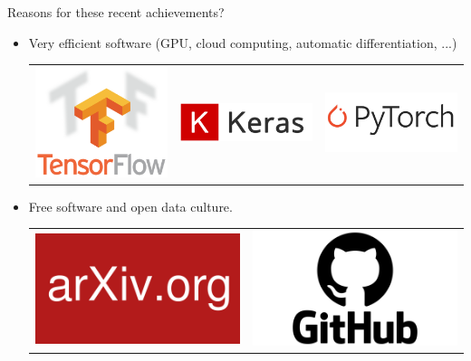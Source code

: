 \documentclass[handout]{beamer}
\begin{document}
\begin{frame}[t]{Reasons for these recent achievements?}
\begin{itemize}
{}      

\item<4-> Very efficient software (GPU, cloud computing, automatic differentiation, ...)
 {
\begin{center}
    \begin{tabular}{ccc}
        \includegraphics[width=.25\textwidth]{fig/L1/TensorFlowLogo.png} &  
         \includegraphics[width=.25\textwidth]{fig/L1/keraslogo.png}& 
         \includegraphics[width=.25\textwidth]{fig/L1/pytorchlogo.png}\\
    \end{tabular}
\end{center}
}


\item<5-> Free software and open data culture.
 {
\begin{center}
    \begin{tabular}{cc}
        \includegraphics[width=.25\textwidth]{fig/L1/ArXiv_logo.png} &  
         \includegraphics[width=.25\textwidth]{fig/L1/GitHub-Logo.png}\\
    \end{tabular}
\end{center}
}

    \end{itemize}

\end{frame}
\end{document}
